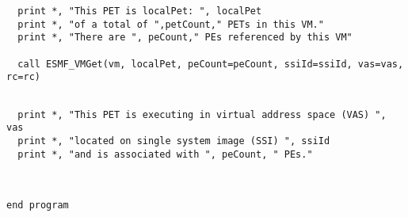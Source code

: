  \begin{verbatim}
  print *, "This PET is localPet: ", localPet
  print *, "of a total of ",petCount," PETs in this VM."
  print *, "There are ", peCount," PEs referenced by this VM"

  call ESMF_VMGet(vm, localPet, peCount=peCount, ssiId=ssiId, vas=vas, rc=rc)
 
\end{verbatim}
 

 \begin{verbatim}
  print *, "This PET is executing in virtual address space (VAS) ", vas
  print *, "located on single system image (SSI) ", ssiId
  print *, "and is associated with ", peCount, " PEs."

 
\end{verbatim}
 

 \begin{verbatim}
end program
 
\end{verbatim}

\setlength{\parskip}{\oldparskip}
\setlength{\parindent}{\oldparindent}
\setlength{\baselineskip}{\oldbaselineskip}
